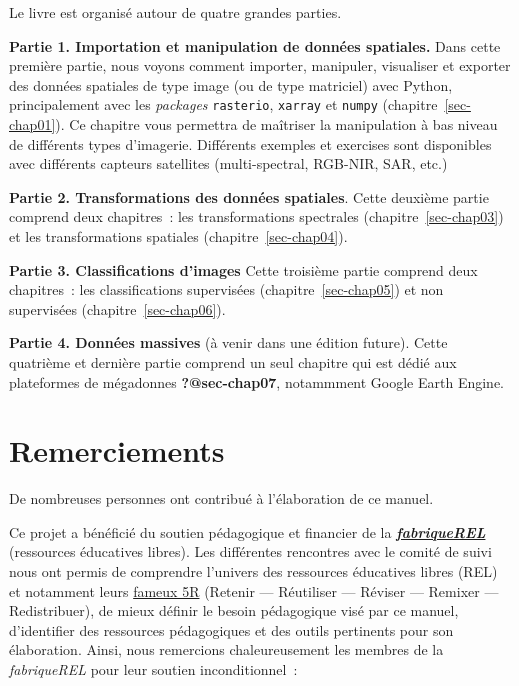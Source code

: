\documentclass[
  11pt,
  letterpaper,
  open=any,
  twoside=false,
  french]{scrbook}
\begin{document}

Le livre est organisé autour de quatre grandes parties.

\textbf{Partie 1. Importation et manipulation de données spatiales.}
Dans cette première partie, nous voyons comment importer, manipuler,
visualiser et exporter des données spatiales de type image (ou de type
matriciel) avec Python, principalement avec les \emph{packages}
\texttt{rasterio}, \texttt{xarray} et \texttt{numpy}
(chapitre~\ref{sec-chap01}). Ce chapitre vous permettra de maîtriser la
manipulation à bas niveau de différents types d'imagerie. Différents
exemples et exercises sont disponibles avec différents capteurs
satellites (multi-spectral, RGB-NIR, SAR, etc.)

\textbf{Partie 2. Transformations des données spatiales}. Cette deuxième
partie comprend deux chapitres~: les transformations spectrales
(chapitre~\ref{sec-chap03}) et les transformations spatiales
(chapitre~\ref{sec-chap04}).

\textbf{Partie 3. Classifications d'images} Cette troisième partie
comprend deux chapitres~: les classifications supervisées
(chapitre~\ref{sec-chap05}) et non supervisées
(chapitre~\ref{sec-chap06}).

\textbf{Partie 4. Données massives} (à venir dans une édition future).
Cette quatrième et dernière partie comprend un seul chapitre qui est
dédié aux plateformes de mégadonnes \textbf{?@sec-chap07}, notammment
Google Earth Engine.

\section*{Remerciements}\label{sect005}


De nombreuses personnes ont contribué à l'élaboration de ce manuel.

Ce projet a bénéficié du soutien pédagogique et financier de la
\href{https://fabriquerel.org/}{\textbf{\emph{fabriqueREL}}} (ressources
éducatives libres). Les différentes rencontres avec le comité de suivi
nous ont permis de comprendre l'univers des ressources éducatives libres
(REL) et notamment leurs \href{https://fabriquerel.org/rel/}{fameux 5R}
(Retenir --- Réutiliser --- Réviser --- Remixer --- Redistribuer), de
mieux définir le besoin pédagogique visé par ce manuel, d'identifier des
ressources pédagogiques et des outils pertinents pour son élaboration.
Ainsi, nous remercions chaleureusement les membres de la
\emph{fabriqueREL} pour leur soutien inconditionnel~:
\end{document}
